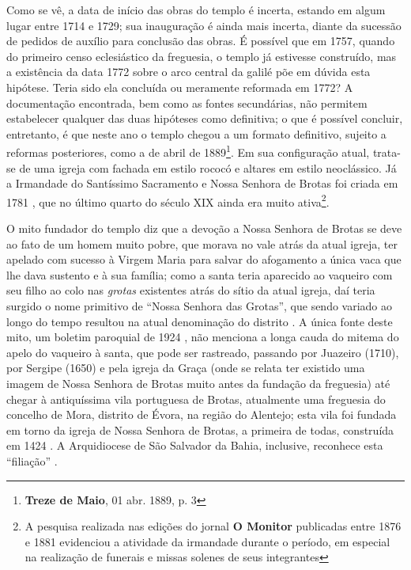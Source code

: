 Como se vê, a data de início das obras do templo é incerta, estando em algum lugar entre 1714 e 1729; sua inauguração é ainda mais incerta, diante da sucessão de pedidos de auxílio para conclusão das obras. É possível que em 1757, quando do primeiro censo eclesiástico da freguesia, o templo já estivesse construído, mas a existência da data 1772 sobre o arco central da galilé põe em dúvida esta hipótese. Teria sido ela concluída ou meramente reformada em 1772? A documentação encontrada, bem como as fontes secundárias, não permitem estabelecer qualquer das duas hipóteses como definitiva; o que é possível concluir, entretanto, é que neste ano o templo chegou a um formato definitivo, sujeito a reformas posteriores, como a de abril de 1889\footnote{\textbf{Treze de Maio}, 01 abr. 1889, p. 3}. Em sua configuração atual, trata-se de uma igreja com fachada em estilo rococó e altares em estilo neoclássico. Já a Irmandade do Santíssimo Sacramento e Nossa Senhora de Brotas foi criada em 1781 \cite[p.~172]{VASCONCELOS2002}, que no último quarto do século XIX ainda era muito ativa\footnote{A pesquisa realizada nas edições do jornal \textbf{O Monitor} publicadas entre 1876 e 1881 evidenciou a atividade da irmandade durante o período, em especial na realização de funerais e missas solenes de seus integrantes}.

O mito fundador do templo diz que a devoção a Nossa Senhora de Brotas se deve ao fato de um homem muito pobre, que morava no vale atrás da atual igreja, ter apelado com sucesso à Virgem Maria para salvar do afogamento a única vaca que lhe dava sustento e à sua família; como a santa teria aparecido ao vaqueiro com seu filho ao colo nas \textit{grotas} existentes atrás do sítio da atual igreja, daí teria surgido o nome primitivo de ``Nossa Senhora das Grotas'', que sendo variado ao longo do tempo resultou na atual denominação do distrito \cite{campos_brotas_1942,texbar_capellas_1930}. A única fonte deste mito, um boletim paroquial de 1924 \cite[p.~345]{texbar_capellas_1930}, não menciona a longa cauda do mitema do apelo do vaqueiro à santa, que pode ser rastreado, passando por Juazeiro (1710), por Sergipe (1650) e pela igreja da Graça (onde se relata ter existido uma imagem de Nossa Senhora de Brotas muito antes da fundação da freguesia) \cite[p.~89-92]{campos_brotas_1942} até chegar à antiquíssima vila portuguesa de Brotas, atualmente uma freguesia do concelho de Mora, distrito de Évora, na região do Alentejo; esta vila foi fundada em torno da igreja de Nossa Senhora de Brotas, a primeira de todas, construída em 1424 \cite{campos_brotas_1942, correia_brotas_2010, portugal_brotas_2015}. A Arquidiocese de São Salvador da Bahia, inclusive, reconhece esta ``filiação'' \cite{arqui_brotas_2015}.

